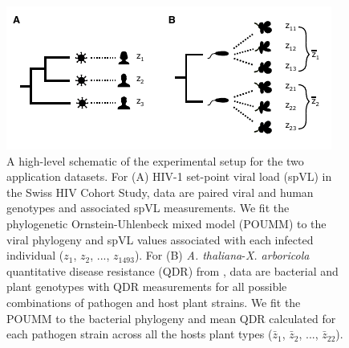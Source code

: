 \documentclass[11pt]{article}
\begin{document}
\begin{linenumbers}
\begin{figure}[H]
\begin{center}
    \includegraphics[width = \linewidth]{figures/application_experimental_setups.pdf}
	\caption{A high-level schematic of the experimental setup for the two application datasets. For (A) HIV-1 set-point viral load (spVL) in the Swiss HIV Cohort Study, data are paired viral and human genotypes and associated spVL measurements. We fit the phylogenetic Ornstein-Uhlenbeck mixed model (POUMM) to the viral phylogeny and spVL values associated with each infected individual ($z_1$, $z_2$, ..., $z_{1493}$). For (B) \emph{A. thaliana}-\emph{X. arboricola} quantitative disease resistance (QDR) from \cite{Wang2018Two-wayGenomes}, data are bacterial and plant genotypes with QDR measurements for all possible combinations of pathogen and host plant strains. We fit the POUMM to the bacterial phylogeny and mean QDR calculated for each pathogen strain across all the hosts plant types ($\bar{z}_1$, $\bar{z}_2$, ..., $\bar{z}_{22}$).}
	\label{fig:application-exp-setup}
	\end{center}
\end{figure}


\end{linenumbers}
\end{document}
